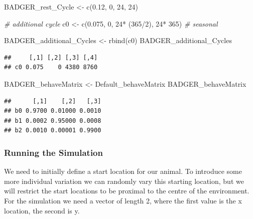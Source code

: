 \documentclass[10pt,a4paper]{article}
\newenvironment{Shaded}{}{}
\newcommand{\CommentTok}[1]{\textit{#1}}
\newcommand{\DecValTok}[1]{#1}
\newcommand{\FloatTok}[1]{#1}
\newcommand{\FunctionTok}[1]{#1}
\newcommand{\NormalTok}[1]{#1}
\newcommand{\OtherTok}[1]{#1}
\newcommand{\SpecialCharTok}[1]{#1}
\begin{document}
\begin{Shaded}
\begin{Highlighting}[]
\NormalTok{BADGER\_rest\_Cycle }\OtherTok{\textless{}{-}} \FunctionTok{c}\NormalTok{(}\FloatTok{0.12}\NormalTok{, }\DecValTok{0}\NormalTok{, }\DecValTok{24}\NormalTok{, }\DecValTok{24}\NormalTok{)}

\CommentTok{\# additional cycle}
\NormalTok{c0 }\OtherTok{\textless{}{-}} \FunctionTok{c}\NormalTok{(}\FloatTok{0.075}\NormalTok{, }\DecValTok{0}\NormalTok{, }\DecValTok{24}\SpecialCharTok{*}\NormalTok{ (}\DecValTok{365}\SpecialCharTok{/}\DecValTok{2}\NormalTok{), }\DecValTok{24}\SpecialCharTok{*} \DecValTok{365}\NormalTok{) }\CommentTok{\# seasonal}

\NormalTok{BADGER\_additional\_Cycles }\OtherTok{\textless{}{-}} \FunctionTok{rbind}\NormalTok{(c0)}
\NormalTok{BADGER\_additional\_Cycles}
\end{Highlighting}
\end{Shaded}

\begin{verbatim}
##     [,1] [,2] [,3] [,4]
## c0 0.075    0 4380 8760
\end{verbatim}

\begin{Shaded}
\begin{Highlighting}[]
\NormalTok{BADGER\_behaveMatrix }\OtherTok{\textless{}{-}}\NormalTok{ Default\_behaveMatrix}
\NormalTok{BADGER\_behaveMatrix}
\end{Highlighting}
\end{Shaded}

\begin{verbatim}
##      [,1]    [,2]   [,3]
## b0 0.9700 0.01000 0.0010
## b1 0.0002 0.95000 0.0008
## b2 0.0010 0.00001 0.9900
\end{verbatim}

\hypertarget{running-the-simulation}{%
\subsubsection{Running the Simulation}\label{running-the-simulation}}

We need to initially define a start location for our animal.
To introduce some more individual variation we can randomly vary this starting location, but we will restrict the start locations to be proximal to the centre of the environment.
For the simulation we need a vector of length 2, where the first value is the x location, the second is y.
\end{document}
